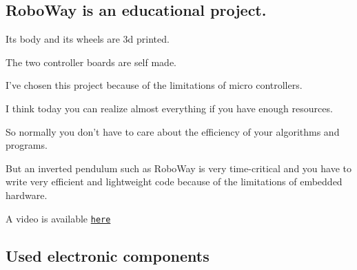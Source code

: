 \subsection*{\-Robo\-Way is an educational project.}

\-Its body and its wheels are 3d printed.\par
 \-The two controller boards are self made.\par
\par
 \-I've chosen this project because of the limitations of micro controllers.\par
 \-I think today you can realize almost everything if you have enough resources.\par
 \-So normally you don't have to care about the efficiency of your algorithms and programs.\par
\par


\-But an inverted pendulum such as \-Robo\-Way is very time-\/critical and you have to write very efficient and lightweight code because of the limitations of embedded hardware.\par
\par


\-A video is available \href{https://www.youtube.com/watch?v=RWkzlugv2Mk}{\tt here}

    

\par


\subsection*{\-Used electronic components}


